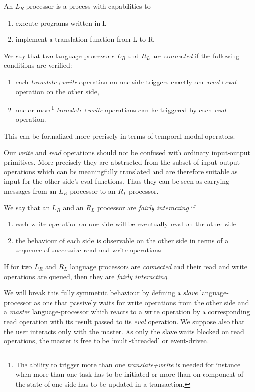 \documentclass{article}
\begin{document}
An $L_R$-processor is a process with capabilities to
\begin{enumerate}
\item execute programs written in L
\item implement a translation function from L to R.
\end{enumerate}

We say that two language processors $L_R$ and $R_L$ are {\em connected}
if the following conditions are verified:
\begin{enumerate}
\item each {\em translate+write} operation on one side triggers exactly one
{\em read+eval} operation on the other side,
\item one or more\footnote{The ability to trigger more than one {\em translate+write}
is needed for instance when more than one task has to be
initiated or more than on component of the state of one side
has to be updated in a transaction.
} {\em translate+write} operations
can be triggered by each {\em eval} operation.
\end{enumerate}

{\flushleft This}
can be formalized more precisely in terms of temporal modal
operators. 

Our {\em write} and {\em read}
operations should not be confused with
ordinary input-output primitives. More precisely they are abstracted
from the subset of input-output operations which can be meaningfully
translated and are therefore suitable
as input for the other side's eval functions.
Thus they can be seen as carrying messages from an $L_R$
processor to an $R_L$ processor.

We say that an $L_R$ and an $R_L$ processor
are {\em fairly interacting} if
\begin{enumerate}
\item each write operation on one side will be 
eventually read on the other side
\item
the behaviour of
each side is observable on the other side in terms of a sequence of successive
read and write operations
\end{enumerate}

If for two $L_R$ and $R_L$ language processors are {\em connected}
and their read and write operations are queued, then
they are {\em fairly interacting}.

We will break this fully symmetric behaviour by defining
a {\em slave} language-processor as one that passively waits
for write operations from the other side and a {\em master}
language-processor which reacts to a write operation
by a corresponding read operation with
its result passed to its {\em eval} operation.
We suppose also that the user interacts only with the master.
As only the slave waits blocked on read operations, the
master is free to be `multi-threaded' or event-driven.
\end{document}
